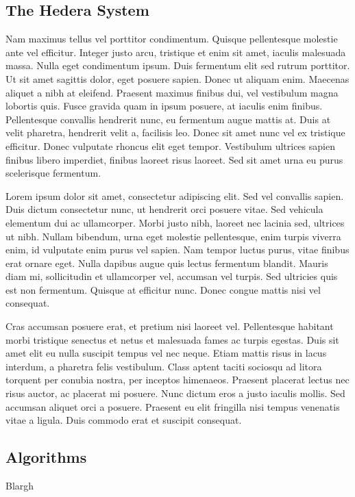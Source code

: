 \documentclass[11pt]{article}
\begin{document}
\begin{multicols}{2}
\section{The Hedera System}
Nam \cite{Hedera} maximus tellus vel porttitor condimentum. Quisque pellentesque molestie ante vel efficitur. Integer justo arcu, tristique et enim sit amet, iaculis malesuada massa. Nulla eget condimentum ipsum. Duis fermentum elit sed rutrum porttitor. Ut sit amet sagittis dolor, eget posuere sapien. Donec ut aliquam enim. Maecenas aliquet a nibh at eleifend. Praesent maximus finibus dui, vel vestibulum magna lobortis quis. Fusce gravida quam in ipsum posuere, at iaculis enim finibus. Pellentesque convallis hendrerit nunc, eu fermentum augue mattis at. Duis at velit pharetra, hendrerit velit a, facilisis leo. Donec sit amet nunc vel ex tristique efficitur. Donec vulputate rhoncus elit eget tempor. Vestibulum ultrices sapien finibus libero imperdiet, finibus laoreet risus laoreet. Sed sit amet urna eu purus scelerisque fermentum.

Lorem ipsum dolor sit amet, consectetur adipiscing elit. Sed vel convallis sapien. Duis dictum consectetur nunc, ut hendrerit orci posuere vitae. Sed vehicula elementum dui ac ullamcorper. Morbi justo nibh, laoreet nec lacinia sed, ultrices ut nibh. Nullam bibendum, urna eget molestie pellentesque, enim turpis viverra enim, id vulputate enim purus vel sapien. Nam tempor luctus purus, vitae finibus erat ornare eget. Nulla dapibus augue quis lectus fermentum blandit. Mauris diam mi, sollicitudin et ullamcorper vel, accumsan vel turpis. Sed ultricies quis est non fermentum. Quisque at efficitur nunc. Donec congue mattis nisi vel consequat.

Cras accumsan posuere erat, et pretium nisi laoreet vel. Pellentesque habitant morbi tristique senectus et netus et malesuada fames ac turpis egestas. Duis sit amet elit eu nulla suscipit tempus vel nec neque. Etiam mattis risus in lacus interdum, a pharetra felis vestibulum. Class aptent taciti sociosqu ad litora torquent per conubia nostra, per inceptos himenaeos. Praesent placerat lectus nec risus auctor, ac placerat mi posuere. Nunc dictum eros a justo iaculis mollis. Sed accumsan aliquet orci a posuere. Praesent eu elit fringilla nisi tempus venenatis vitae a ligula. Duis commodo erat et suscipit consequat.

\subsection{Algorithms}
Blargh


\end{multicols}
\end{document}
